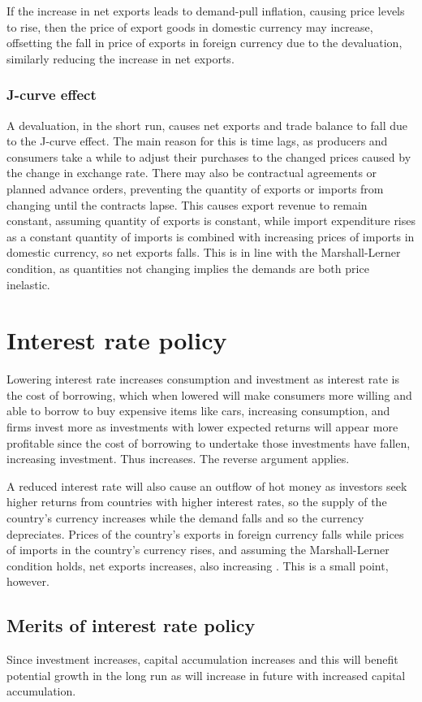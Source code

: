 \documentclass[Economics.tex]{subfiles}
\begin{document}
If the increase in net exports leads to demand-pull inflation, causing price levels to rise, then the price of export goods in domestic currency may increase, offsetting the fall in price of exports in foreign currency due to the devaluation, similarly reducing the increase in net exports.
\subsubsection{J-curve effect}
A devaluation, in the short run, causes net exports and trade balance to fall due to the J-curve effect. The main reason for this is time lags, as producers and consumers take a while to adjust their purchases to the changed prices caused by the change in exchange rate. There may also be contractual agreements or planned advance orders, preventing the quantity of exports or imports from changing until the contracts lapse.  This causes export revenue to remain constant, assuming quantity of exports is constant, while import expenditure rises as a constant quantity of imports is combined with increasing prices of imports in domestic currency, so net exports falls. This is in line with the Marshall-Lerner condition, as quantities not changing implies the demands are both price inelastic.
\section{Interest rate policy}
Lowering interest rate increases consumption and investment as interest rate is the cost of borrowing, which when lowered will make consumers more willing and able to borrow to buy expensive items like cars, increasing consumption, and firms invest more as investments with lower expected returns will appear more profitable since the cost of borrowing to undertake those investments have fallen, increasing investment. Thus \AD{} increases. The reverse argument applies.

A reduced interest rate will also cause an outflow of hot money as investors seek higher returns from countries with higher interest rates, so the supply of the country's currency increases while the demand falls and so the currency depreciates. Prices of the country's exports in foreign currency falls while prices of imports in the country's currency rises, and assuming the Marshall-Lerner condition holds, net exports increases, also increasing \AD{}. This is a small point, however.
\subsection{Merits of interest rate policy}
Since investment increases, capital accumulation increases and this will benefit potential growth in the long run as \AS{} will increase in future with increased capital accumulation.
\end{document}
